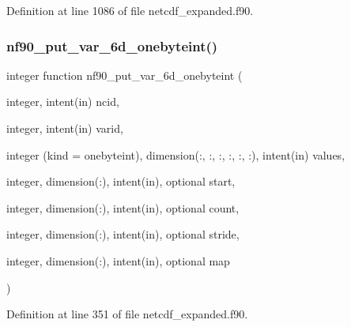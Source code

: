 Definition at line 1086 of file netcdf\+\_\+expanded.\+f90.

\mbox{\label{netcdf__expanded_8f90_acbbb7508001e36e524a6f1798724d075}} 
\subsubsection{\texorpdfstring{nf90\+\_\+put\+\_\+var\+\_\+6d\+\_\+onebyteint()}{nf90\_put\_var\_6d\_onebyteint()}}
{\footnotesize\ttfamily integer function nf90\+\_\+put\+\_\+var\+\_\+6d\+\_\+onebyteint (\begin{DoxyParamCaption}\item[{integer, intent(in)}]{ncid,  }\item[{integer, intent(in)}]{varid,  }\item[{integer (kind = onebyteint), dimension(\+:, \+:, \+:, \+:, \+:, \+:), intent(in)}]{values,  }\item[{integer, dimension(\+:), intent(in), optional}]{start,  }\item[{integer, dimension(\+:), intent(in), optional}]{count,  }\item[{integer, dimension(\+:), intent(in), optional}]{stride,  }\item[{integer, dimension(\+:), intent(in), optional}]{map }\end{DoxyParamCaption})}



Definition at line 351 of file netcdf\+\_\+expanded.\+f90.

\mbox{\label{netcdf__expanded_8f90_a38ac19c534b329e1e4d866f028700bea}} 
